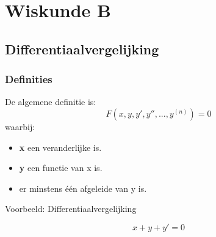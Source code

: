 \documentclass[12pt]{report}
\newcommand{\example}[2]{
    \hrulefill
    
    Voorbeeld: #1
    
    #2
    
    \hrulefill
}
\begin{document}
\part{Wiskunde B}
\chapter{Differentiaalvergelijking}
\section{Definities}
De algemene definitie is:
$$F(x, y, y', y'', ..., y^{(n)}) = 0$$
waarbij: \begin{itemize}
\item \textbf{x} een veranderlijke is.
\item \textbf{y} een functie van x is.
\item er minstens één afgeleide van y is.
\end{itemize}
\example{Differentiaalvergelijking}{
    $$ x + y + y' = 0$$
}
\end{document}

